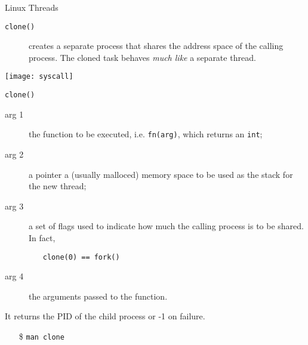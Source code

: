 \begin{frame}{Linux Threads}
  \begin{description}
  \item[\texttt{clone()}] creates a separate process that shares the address space of the
    calling process. The cloned task behaves \emph{much like} a separate thread.
  \end{description}
  \centering \texttt{[image: syscall]}  
\end{frame}

\begin{frame}{\texttt{clone()}}
  \begin{center}
  \end{center}
  \begin{small}
    \begin{description}
    \item[arg 1] the function to be executed, i.e. \texttt{fn(arg)}, which returns an \texttt{int};
    \item[arg 2] a pointer {\pright} a (usually malloced) memory space to be used as
      the stack for the new thread;
    \item[arg 3] a set of flags used to indicate how much the calling process is to be
      shared. In fact,
      \begin{itemize}
      \item[]  \texttt{clone(0) == fork()}
      \end{itemize}
    \item[arg 4] the arguments passed to the function.
    \end{description}
    It returns the PID of the child process or -1 on failure.
  \end{small}
  \begin{itemize}
    \item[\$] \texttt{man clone}
  \end{itemize}
\end{frame}


